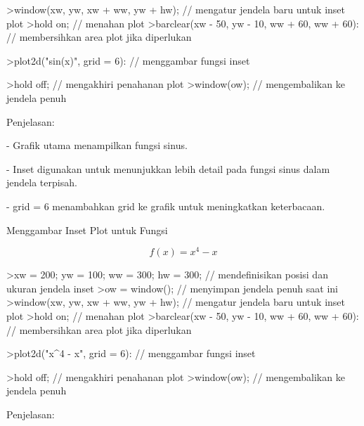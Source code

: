 \documentclass{article}
\begin{document}
\begin{eulernotebook}
\begin{eulercomment}
\begin{eulercomment}
\begin{eulercomment}
\begin{eulercomment}
\begin{euleroutput}
\end{euleroutput}
\begin{eulerprompt}
>window(xw, yw, xw + ww, yw + hw); // mengatur jendela baru untuk inset plot
>hold on; // menahan plot
>barclear(xw - 50, yw - 10, ww + 60, ww + 60): // membersihkan area plot jika diperlukan
\end{eulerprompt}
\begin{eulerprompt}
>plot2d("sin(x)", grid = 6): // menggambar fungsi inset
\end{eulerprompt}
\begin{eulerprompt}
>hold off; // mengakhiri penahanan plot
>window(ow); // mengembalikan ke jendela penuh
\end{eulerprompt}
\begin{eulercomment}
Penjelasan:

- Grafik utama menampilkan fungsi sinus.

- Inset digunakan untuk menunjukkan lebih detail pada fungsi sinus
dalam   jendela terpisah.

- grid = 6 menambahkan grid ke grafik untuk meningkatkan keterbacaan.

\end{eulercomment}
\eulersubheading{}
\begin{eulercomment}
Menggambar Inset Plot untuk Fungsi\\
\end{eulercomment}
\begin{eulerformula}
\[
f(x)=x^4-x
\]
\end{eulerformula}
\begin{eulerprompt}
>xw = 200; yw = 100; ww = 300; hw = 300; // mendefinisikan posisi dan ukuran jendela inset
>ow = window(); // menyimpan jendela penuh saat ini
>window(xw, yw, xw + ww, yw + hw); // mengatur jendela baru untuk inset plot
>hold on; // menahan plot
>barclear(xw - 50, yw - 10, ww + 60, ww + 60): // membersihkan area plot jika diperlukan
\end{eulerprompt}
\begin{eulerprompt}
>plot2d("x^4 - x", grid = 6): // menggambar fungsi inset
\end{eulerprompt}
\begin{eulerprompt}
>hold off; // mengakhiri penahanan plot
>window(ow); // mengembalikan ke jendela penuh
\end{eulerprompt}
\begin{eulercomment}
Penjelasan:


\end{eulercomment}
\end{eulercomment}
\end{eulercomment}
\end{eulercomment}
\end{eulercomment}
\end{eulernotebook}
\end{document}
